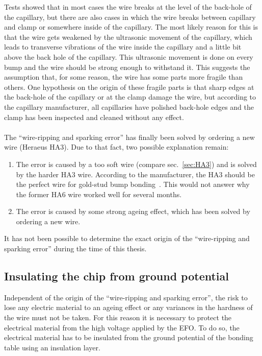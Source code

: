 Tests showed that in most cases the wire breaks at the level of the back-hole of the capillary, but there are also cases in which the wire breaks between capillary and clamp or somewhere inside of the capillary. The most likely reason for this is that the wire gets weakened by the ultrasonic movement of the capillary, which leads to transverse vibrations of the wire inside the capillary and a little bit above the back hole of the capillary. This ultrasonic movement is done on every bump and the wire should be strong enough to withstand it. This suggests the assumption that, for some reason, the wire has some parts more fragile than others. One hypothesis on the origin of these fragile parts is that sharp edges at the back-hole of the capillary or at the clamp damage the wire, but according to the capillary manufacturer, all capillaries have polished back-hole edges and the clamp has been inspected and cleaned without any effect.\\
\\The ``wire-ripping and sparking error'' has finally been solved by ordering a new wire (Heraeus HA3). Due to that fact, two possible explanation remain:
\begin{enumerate}
\item The error is caused by a too soft wire (compare sec.~\ref{sec:HA3}) and is solved by the harder HA3 wire. According to the manufacturer, the HA3 should be the perfect wire for gold-stud bump bonding~\cite{Koe14}. This would not answer why the former HA6 wire worked well for several months.
\item The error is caused by some strong ageing effect, which has been solved by ordering a new wire.%
\end{enumerate}
It has not been possible to determine the exact origin of the ``wire-ripping and sparking error'' during the time of this thesis.

\subsection{Insulating the chip from ground potential}
Independent of the origin of the ``wire-ripping and sparking error'', the risk to lose any electric material to an ageing effect or any variances in the hardness of the wire must not be taken. For this reason it is necessary to protect the electrical material from the high voltage applied by the \ac{EFO}. To do so, the electrical material has to be insulated from the ground potential of the bonding table using an insulation layer.
